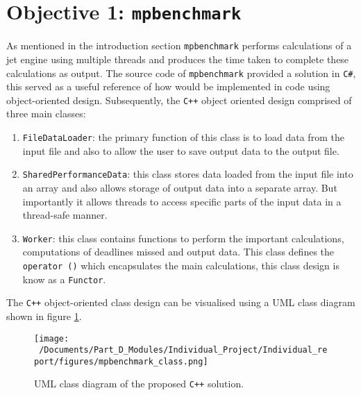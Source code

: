 \section{Objective 1: \texttt{mpbenchmark}}
As mentioned in the introduction section \texttt{mpbenchmark} performs calculations of a jet engine using multiple threads and produces the time taken to complete these calculations as output. The source code of \texttt{mpbenchmark} provided a solution in \texttt{C\#}, this served as a useful reference of how would be implemented in code using object-oriented design. Subsequently, the \texttt{C++} object oriented design comprised of three main classes:

\begin{enumerate}
	\item \texttt{FileDataLoader}: the primary function of this class is to load data from the input file and also to allow the user to save output data to the output file.
	\item \texttt{SharedPerformanceData}: this class stores data loaded from the input file into an array and also allows storage of output data into a separate array. But importantly it allows threads to access specific parts of the input data in a thread-safe manner. 
	\item \texttt{Worker}: this class contains functions to perform the important calculations, computations of deadlines missed and output data. This class defines the \texttt{operator ()} which encapsulates the main calculations, this class design is know as a \texttt{Functor}.
\end{enumerate}

The \texttt{C++} object-oriented class design can be visualised using a UML class diagram shown in figure \ref{fig:mpbenchmark_UML_diagram}.

\begin{figure}[H] %
	\centering
	\texttt{[image: ~/Documents/Part\_D\_Modules/Individual\_Project/Individual\_report/figures/mpbenchmark\_class.png]} %
	\caption{UML class diagram of the proposed \texttt{C++} solution.}
	\label{fig:mpbenchmark_UML_diagram} %
\end{figure}

